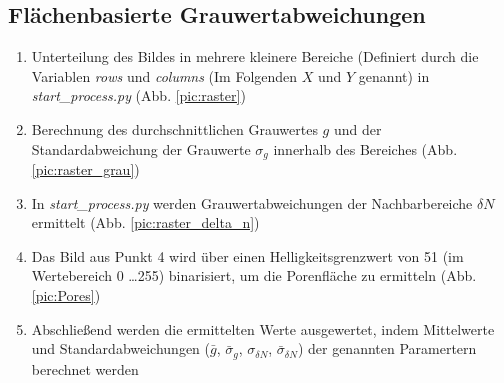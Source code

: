 \documentclass{article}
\begin{document}
\subsection{Flächenbasierte Grauwertabweichungen}
\begin{enumerate}
	\item Unterteilung des Bildes in mehrere kleinere Bereiche (Definiert durch die Variablen \textit{rows} und \textit{columns} (Im Folgenden $X$ und $Y$ genannt)  in \textit{start\_process.py} (Abb. \ref{pic:raster})
	\item Berechnung des durchschnittlichen Grauwertes $g$ und der Standardabweichung der Grauwerte $\sigma_g$ innerhalb des Bereiches (Abb. \ref{pic:raster_grau})
	\item In \textit{start\_process.py} werden Grauwertabweichungen der Nachbarbereiche $\delta N$ ermittelt (Abb. \ref{pic:raster_delta_n})
	\item Das Bild aus Punkt 4 wird über einen Helligkeitsgrenzwert von 51 (im Wertebereich 0 \dots 255) binarisiert, um die Porenfläche zu ermitteln (Abb. \ref{pic:Pores})
	\item Abschließend werden die ermittelten Werte ausgewertet, indem Mittelwerte und Standardabweichungen ($\bar{g}$, $\bar{\sigma}_g$, $\sigma_{\delta N}$, $\bar{\sigma}_{\delta N}$) der genannten Paramertern berechnet werden
\end{enumerate}
\end{document}
